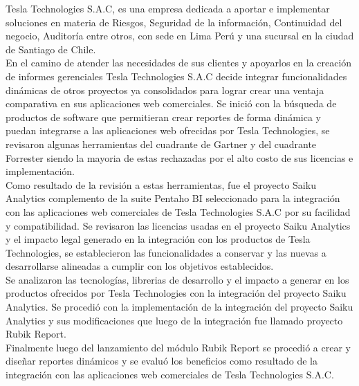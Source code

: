 \makeatletter
\newenvironment{abstract}{%
	\titlepage
	\null\vfil
	\@beginparpenalty\@lowpenalty
	\begin{center}%
		\large\bfseries\abstractname
		\@endparpenalty\@M
	\end{center}
}%
{\par\vfil\null
	\endtitlepage}
\makeatother

\begin{titlepage}
	 \begin{abstract}
		\begin{spacing}{1.5}
		Tesla Technologies S.A.C, es una empresa dedicada a aportar e implementar soluciones en materia de Riesgos, Seguridad de la información, Continuidad del negocio, Auditoría entre otros, con sede en Lima Perú y una sucursal en la ciudad de Santiago de Chile.\\	
		En el camino de atender las necesidades de sus clientes y apoyarlos en la creación de informes gerenciales Tesla Technologies S.A.C decide integrar funcionalidades dinámicas de otros proyectos ya consolidados para lograr crear una ventaja comparativa en sus aplicaciones web comerciales.
		Se inició con la búsqueda de productos de software que permitieran crear reportes de forma dinámica y puedan integrarse a las aplicaciones web ofrecidas por Tesla Technologies, se revisaron algunas herramientas del cuadrante de Gartner y del cuadrante Forrester siendo la mayoria de estas rechazadas por el alto costo de sus licencias e implementación.\\
		Como resultado de la revisión a estas herramientas, fue el proyecto Saiku Analytics complemento de la suite Pentaho BI seleccionado para la integración con las aplicaciones web comerciales de Tesla Technologies S.A.C por su facilidad y compatibilidad.
		Se revisaron las licencias usadas en el proyecto Saiku Analytics y el impacto legal generado en la integración con los productos de Tesla Technologies, se establecieron las funcionalidades a conservar y las nuevas a desarrollarse alineadas a cumplir con los objetivos establecidos.\\	
		Se analizaron las tecnologías, librerias de desarrollo y el impacto a generar en los productos ofrecidos por Tesla Technologies con la integración del proyecto Saiku Analytics.
		Se procedió con la implementación de la integración del proyecto Saiku Analytics y sus modificaciones que luego de la integración fue llamado proyecto Rubik Report.\\
		Finalmente luego del lanzamiento del módulo Rubik Report se procedió a crear y diseñar reportes dinámicos y se evaluó los beneficios como resultado de la integración con las aplicaciones web comerciales de Tesla Technologies S.A.C.\\		
		\end{spacing}
	\end{abstract}
\end{titlepage}
